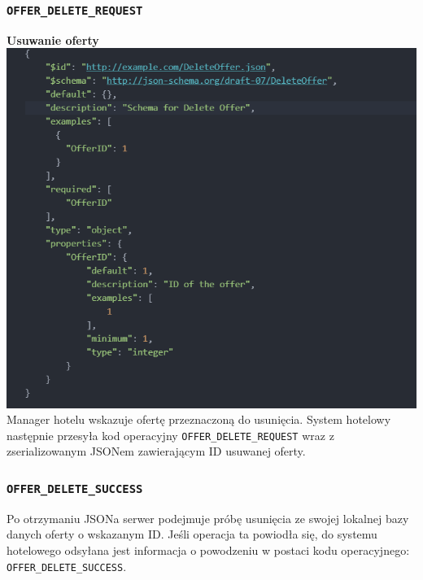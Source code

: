 \documentclass{article}
\begin{document}
\subsubsection{\texttt{OFFER\_DELETE\_REQUEST}}
\textbf{Usuwanie oferty}\\
\includegraphics[width=\linewidth]{Oferta-Hotel-Serwer/Offer_DeleteJSON.png}
Manager hotelu wskazuje ofertę przeznaczoną do usunięcia. System hotelowy następnie przesyła kod operacyjny \texttt{OFFER\_DELETE\_REQUEST} wraz z zserializowanym JSONem zawierającym ID usuwanej oferty.

\subsubsection{\texttt{OFFER\_DELETE\_SUCCESS}}
Po otrzymaniu JSONa serwer podejmuje próbę usunięcia ze swojej lokalnej bazy danych oferty o wskazanym ID. Jeśli operacja ta powiodła się, do systemu hotelowego odsyłana jest informacja o powodzeniu w postaci kodu operacyjnego: \texttt{OFFER\_DELETE\_SUCCESS}. 
\end{document}
